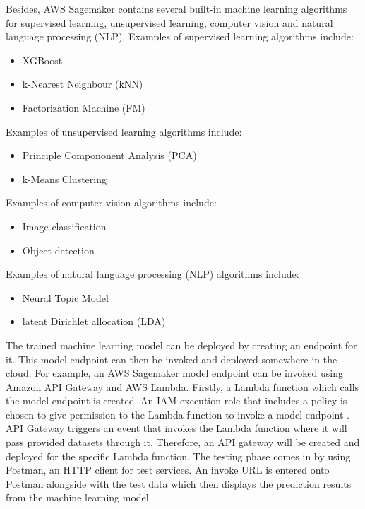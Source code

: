 Besides, AWS Sagemaker contains several built-in machine learning algorithms for supervised learning, unsupervised learning, computer vision and natural language processing (NLP). Examples of supervised learning algorithms include:
\begin{itemize}
    \item XGBoost
    \item k-Nearest Neighbour (kNN)
    \item Factorization Machine (FM)
\end{itemize}
Examples of unsupervised learning algorithms include:
\begin{itemize}
    \item Principle Compononent Analysis (PCA)
    \item k-Means Clustering
\end{itemize}
Examples of computer vision algorithms include:
\begin{itemize}
    \item Image classification
    \item Object detection
\end{itemize}
Examples of natural language processing (NLP) algorithms include:
\begin{itemize}
    \item Neural Topic Model
    \item latent Dirichlet allocation (LDA)
\end{itemize}
The trained machine learning model can be deployed by creating an endpoint for it. This model endpoint can then be invoked and deployed somewhere in the cloud. For example, an AWS Sagemaker model endpoint can be invoked using Amazon API Gateway and AWS Lambda. Firstly, a Lambda function which calls the model endpoint is created. An IAM execution role that includes a policy is chosen to give permission to the Lambda function to invoke a model endpoint \cite{engdahl_2008}. API Gateway triggers an event that invokes the Lambda function where it will pass provided datasets through it. Therefore, an API gateway will be created and deployed for the specific Lambda function. The testing phase comes in by using Postman, an HTTP client for test services. An invoke URL is entered onto Postman alongside with the test data which then displays the prediction results from the machine learning model.

